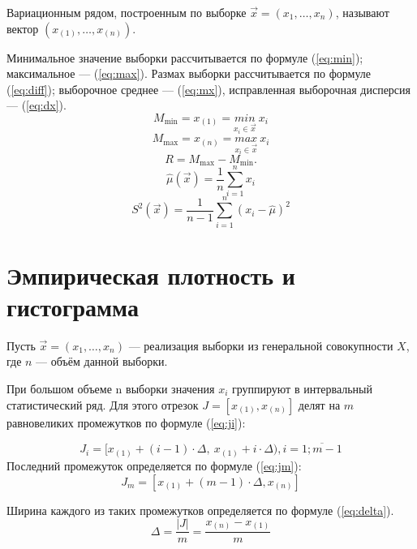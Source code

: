 Вариационным рядом, построенным по выборке $\vec{x} = (x_1, \dots, x_n)$, называют вектор $(x_{(1)}, \dots, x_{(n)})$.

Минимальное значение выборки рассчитывается по формуле (\ref{eq:min}); максимальное --- (\ref{eq:max}). Размах выборки рассчитывается по формуле (\ref{eq:diff}); выборочное среднее --- (\ref{eq:mx}), исправленная выборочная дисперсия --- (\ref{eq:dx}).
\begin{equation}
	\label{eq:min}
	M_{\min} = x_{(1)} = \underset{x_i \in \vec{x}}{min}~x_i
\end{equation}
\begin{equation}
	\label{eq:max}
	M_{\max} = x_{(n)} =  \underset{x_i \in \vec{x}}{max}~x_i
\end{equation}
\begin{equation}
	\label{eq:diff}
	R = M_{\max} - M_{\min}.
\end{equation}
\begin{equation}
	\label{eq:mx}
	\hat\mu(\vec x) = \frac 1n \sum_{i=1}^n x_i
\end{equation}
\begin{equation}
	\label{eq:dx}
	S^2(\vec x) = \frac 1{n - 1} \sum_{i=1}^n (x_i - \hat\mu)^2
\end{equation}


\section{Эмпирическая плотность и гистограмма}
Пусть $\vec{x} = (x_1, \dots, x_n)$ --- реализация выборки из генеральной совокупности $X$, где $n$ --- объём данной выборки.

При большом объеме n выборки  значения $x_i$ группируют в интервальный статистический ряд. Для этого отрезок $J = [x_{(1)}, x_{(n)}]$ делят на $m$ равновеликих промежутков по формуле (\ref{eq:ji}):

\begin{equation}
	\label{eq:ji}
	J_i = [x_{(1)} + (i - 1) \cdot \Delta,\ x_{(1)} + i \cdot \Delta), i = \overline{1; m - 1}
\end{equation}
Последний промежуток определяется по формуле (\ref{eq:jm}):
\begin{equation}
	\label{eq:jm}
	J_{m} = [x_{(1)} + (m - 1) \cdot \Delta, x_{(n)}]
\end{equation}

Ширина каждого из таких промежутков определяется по формуле (\ref{eq:delta}).
\begin{equation}
	\label{eq:delta}
	\Delta = \frac{|J|}{m} = \frac{x_{(n)} - x_{(1)}}{m}
\end{equation}

